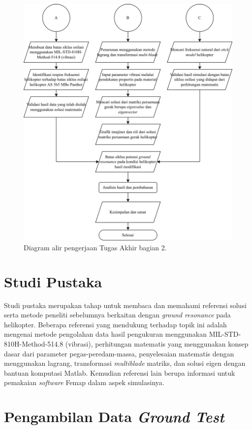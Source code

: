 \begin{figure}[H]
	\centering
	\includegraphics[width=0.95\linewidth]{gambar/TA_flow-Page-2.jpg}
	\caption{Diagram alir pengerjaan Tugas Akhir bagian 2.}
	\label{fig:TA_flow-Page-2.jpg}
\end{figure}

\section{Studi Pustaka}
\label{sec:studipustaka}

Studi pustaka merupakan tahap untuk membaca dan memahami referensi solusi serta metode peneliti sebelumnya berkaitan dengan \textit{ground resonance} pada helikopter. Beberapa referensi yang mendukung terhadap topik ini adalah mengenai metode pengolahan data hasil pengukuran menggunakan MIL-STD-810H-Method-514.8 (vibrasi), perhitungan matematis yang menggunakan konsep dasar dari parameter pegas-peredam-massa, penyelesaian matematis dengan menggunakan lagrang, transformasi \textit{multiblade} matriks, dan solusi eigen dengan bantuan komputasi Matlab. Kemudian referensi lain berupa informasi untuk pemakaian \textit{software} Femap dalam aspek simulasinya.

\section{Pengambilan Data \textit{Ground Test}}
  \label{sec:pengukurandata}

